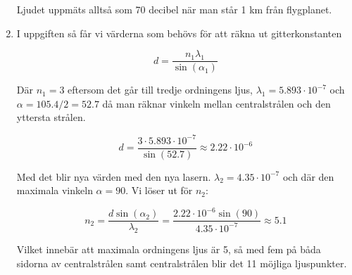 \documentclass[a4paper,12pt]{article}
\begin{document}
\begin{enumerate}
          Ljudet uppmäts alltså som 70 decibel när man står 1 km från flygplanet.

    \item I uppgiften så får vi värderna som behövs för att räkna ut gitterkonstanten

          $$d=\frac{n_1\lambda_1}{\sin(\alpha_1)}$$

          Där $n_1=3$ eftersom det går till tredje ordningens ljus,
          $\lambda_1=5.893\cdot 10^{-7}$ och $\alpha=105.4/2=52.7$ då
          man räknar vinkeln mellan centralstrålen och den yttersta strålen.

          $$d=\frac{3\cdot 5.893\cdot 10^{-7}}{\sin(52.7)}\approx 2.22\cdot 10^{-6}$$

          Med det blir nya värden med den nya lasern. $\lambda_2=4.35\cdot 10^{-7}$ och
          där den maximala vinkeln $\alpha=90$. Vi löser ut för $n_2$:

          $$n_2=\frac{d\sin(\alpha_2)}{\lambda_2}=\frac{2.22\cdot 10^{-6}\sin(90)}{4.35\cdot 10^{-7}}\approx 5.1$$

          Vilket innebär att maximala ordningens ljus är 5, så med fem på båda sidorna av centralstrålen
          samt centralstrålen blir det 11 möjliga ljuspunkter.

\end{enumerate}
\end{document}
